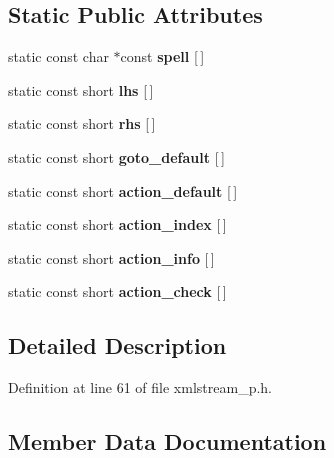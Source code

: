 \subsection*{Static Public Attributes}
\begin{DoxyCompactItemize}
\item 
static const char $\ast$const {\bfseries spell} \mbox{[}$\,$\mbox{]}
\item 
static const short {\bfseries lhs} \mbox{[}$\,$\mbox{]}
\item 
static const short {\bfseries rhs} \mbox{[}$\,$\mbox{]}
\item 
static const short {\bfseries goto\+\_\+default} \mbox{[}$\,$\mbox{]}
\item 
\mbox{\label{class_xml_stream_reader___table_a9df36dc6dbe55a384fc76f772bad86e0}} 
static const short {\bfseries action\+\_\+default} \mbox{[}$\,$\mbox{]}
\item 
\mbox{\label{class_xml_stream_reader___table_ab2ef81c0c130f2507b09a6b6ebbcceee}} 
static const short {\bfseries action\+\_\+index} \mbox{[}$\,$\mbox{]}
\item 
\mbox{\label{class_xml_stream_reader___table_a40a6c02ed22dc1797a551a50e73fa3a7}} 
static const short {\bfseries action\+\_\+info} \mbox{[}$\,$\mbox{]}
\item 
\mbox{\label{class_xml_stream_reader___table_a60f53a1ad3c4541e0e8218915431772e}} 
static const short {\bfseries action\+\_\+check} \mbox{[}$\,$\mbox{]}
\end{DoxyCompactItemize}


\subsection{Detailed Description}


Definition at line 61 of file xmlstream\+\_\+p.\+h.



\subsection{Member Data Documentation}
\mbox{\label{class_xml_stream_reader___table_a69a32c2cc463f1dcd2cac39798e37fb9}} 

